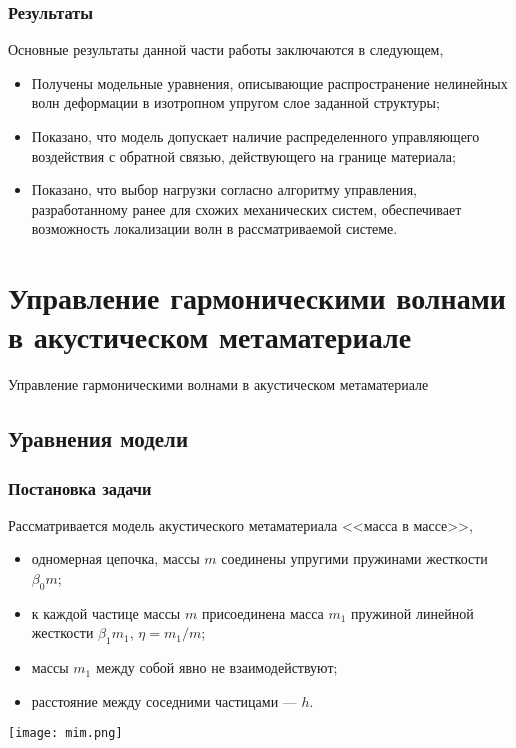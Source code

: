 \begin{frame}
	\frametitle{Результаты}
	Основные результаты данной части работы заключаются в следующем,
	\begin{itemize}
		\item{Получены модельные уравнения, описывающие распространение нелинейных волн деформации в изотропном упругом слое заданной структуры;}
		\item{Показано, что модель допускает наличие распределенного управляющего воздействия с обратной связью, действующего на границе материала;}
		\item{Показано, что выбор нагрузки согласно алгоритму управления, разработанному ранее для схожих механических систем, обеспечивает возможность локализации волн в рассматриваемой системе. }
	\end{itemize}
\end{frame}

\section{Управление гармоническими волнами в акустическом метаматериале}
\begin{frame}
	\begin{center}
		\Large
		Управление гармоническими волнами в акустическом метаматериале
	\end{center}
\end{frame}
\subsection{Уравнения модели}

\begin{frame}
	\frametitle{Постановка задачи}
	Рассматривается модель акустического метаматериала <<масса в массе>>, 
	\begin{itemize}
		\item одномерная цепочка, массы $m$ соединены упругими пружинами жесткости $\beta_0 m$;
		\item к каждой частице массы $m$ присоединена масса $m_1$ пружиной линейной жесткости $\beta_1 m_1$, $\eta = m_1/m$;
		\item массы $m_1$ между собой явно не взаимодействуют;
		\item расстояние между соседними частицами --- $h$.
	\end{itemize}   
	
	\begin{center}
		\texttt{[image: mim.png]}
	\end{center}
	
\end{frame}

